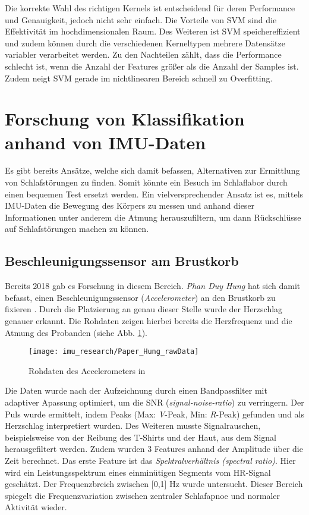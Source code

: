 Die korrekte Wahl des richtigen Kernels ist entscheidend für deren Performance und Genauigkeit, jedoch nicht sehr einfach.
Die Vorteile von SVM sind die Effektivität im hochdimensionalen Raum.
Des Weiteren ist SVM speichereffizient und zudem können durch die verschiedenen Kerneltypen mehrere Datensätze variabler verarbeitet werden.
Zu den Nachteilen zählt, dass die Performance schlecht ist, wenn die Anzahl der Features größer als die Anzahl der Samples ist. 
Zudem neigt SVM gerade im nichtlinearen Bereich schnell zu Overfitting.

\section{Forschung von Klassifikation anhand von IMU-Daten}
Es gibt bereits Ansätze, welche sich damit befassen, Alternativen zur Ermittlung von Schlafstörungen zu finden. 
Somit könnte ein Besuch im Schlaflabor durch einen bequemen Test ersetzt werden. 
Ein vielversprechender Ansatz ist es, mittels IMU-Daten die Bewegung des Körpers zu messen und anhand dieser Informationen unter anderem die Atmung herauszufiltern, um dann Rückschlüsse auf Schlafstörungen machen zu können.

\subsection{Beschleunigungssensor am Brustkorb}
Bereits 2018 gab es Forschung in diesem Bereich. \textit{Phan Duy Hung} hat sich damit befasst, einen Beschleunigungssensor (\textit{Accelerometer}) an den Brustkorb zu fixieren \cite{hungCentralSleepApnea2018}.
Durch die Platzierung an genau dieser Stelle wurde der Herzschlag genauer erkannt. 
Die Rohdaten zeigen hierbei bereits die Herzfrequenz und die Atmung des Probanden (siehe Abb. \ref{imu_research_hung_rawData}). 

\begin{figure}[ht]
    \centering
    \texttt{[image: imu\_research/Paper\_Hung\_rawData]}
    \caption{Rohdaten des Accelerometers in \cite{hungCentralSleepApnea2018}}
    \label{imu_research_hung_rawData}
\end{figure}

Die Daten wurde nach der Aufzeichnung durch einen Bandpassfilter mit adaptiver Apassung optimiert, um die SNR (\textit{signal-noise-ratio}) zu verringern.
Der Puls wurde ermittelt, indem Peaks (Max: \textit{V}-Peak, Min: \textit{R}-Peak) gefunden und als Herzschlag interpretiert wurden.
Des Weiteren musste Signalrauschen, beispielsweise von der Reibung des T-Shirts und der Haut, aus dem Signal herausgefiltert werden. 
Zudem wurden 3 Features anhand der Amplitude über die Zeit berechnet. 
Das erste Feature ist das \textit{Spektralverhältnis (spectral ratio)}. 
Hier wird ein Leistungsspektrum eines einminütigen Segments vom HR-Signal geschätzt. 
Der Frequenzbreich zwischen [0,1] $\si{\hertz}$ wurde untersucht. 
Dieser Bereich spiegelt die Frequenzvariation zwischen zentraler Schlafapnoe und normaler Aktivität wieder.


